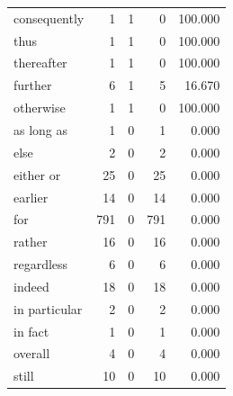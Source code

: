 \begin{table}
\begin{tabular}{lrrrr}
consequently & 1 & 1 & 0 & 100.000 \\
thus & 1 & 1 & 0 & 100.000 \\
thereafter & 1 & 1 & 0 & 100.000 \\
further & 6 & 1 & 5 & 16.670 \\
otherwise & 1 & 1 & 0 & 100.000 \\
as long as & 1 & 0 & 1 & 0.000 \\
else & 2 & 0 & 2 & 0.000 \\
either or & 25 & 0 & 25 & 0.000 \\
earlier & 14 & 0 & 14 & 0.000 \\
for & 791 & 0 & 791 & 0.000 \\
rather & 16 & 0 & 16 & 0.000 \\
regardless & 6 & 0 & 6 & 0.000 \\
indeed & 18 & 0 & 18 & 0.000 \\
in particular & 2 & 0 & 2 & 0.000 \\
in fact & 1 & 0 & 1 & 0.000 \\
overall & 4 & 0 & 4 & 0.000 \\
still & 10 & 0 & 10 & 0.000 \\
\bottomrule
\end{tabular}
\end{table}
